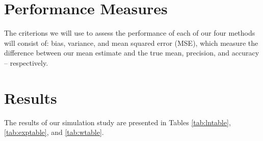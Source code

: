 \documentclass[12pt, twoside]{amherstthesis}
\begin{document}
\hypertarget{performance_measures}{%
\section{Performance Measures}\label{performance_measures}}

The criterions we will use to assess the performance of each of our four methods will consist of: bias, variance, and mean squared error (MSE), which measure the difference between our mean estimate and the true mean, precision, and accuracy -- respectively.

\hypertarget{results}{%
\section{Results}\label{results}}

The results of our simulation study are presented in Tables \ref{tab:lntable}, \ref{tab:exptable}, and \ref{tab:wtable}.
\end{document}
